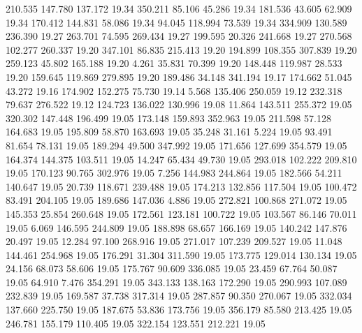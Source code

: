  210.535  147.780  137.172        19.34
 350.211   85.106   45.286        19.34
 181.536   43.605   62.909        19.34
 170.412  144.831   58.086        19.34
  94.045  118.994   73.539        19.34
 334.909  130.589  236.390        19.27
 263.701   74.595  269.434        19.27
 199.595   20.326  241.668        19.27
 270.568  102.277  260.337        19.20
 347.101   86.835  215.413        19.20
 194.899  108.355  307.839        19.20
 259.123   45.802  165.188        19.20
   4.261   35.831   70.399        19.20
 148.448  119.987   28.533        19.20
 159.645  119.869  279.895        19.20
 189.486   34.148  341.194        19.17
 174.662   51.045   43.272        19.16
 174.902  152.275   75.730        19.14
   5.568  135.406  250.059        19.12
 232.318   79.637  276.522        19.12
 124.723  136.022  130.996        19.08
  11.864  143.511  255.372        19.05
 320.302  147.448  196.499        19.05
 173.148  159.893  352.963        19.05
 211.598   57.128  164.683        19.05
 195.809   58.870  163.693        19.05
  35.248   31.161    5.224        19.05
  93.491   81.654   78.131        19.05
 189.294   49.500  347.992        19.05
 171.656  127.699  354.579        19.05
 164.374  144.375  103.511        19.05
  14.247   65.434   49.730        19.05
 293.018  102.222  209.810        19.05
 170.123   90.765  302.976        19.05
   7.256  144.983  244.864        19.05
 182.566   54.211  140.647        19.05
  20.739  118.671  239.488        19.05
 174.213  132.856  117.504        19.05
 100.472   83.491  204.105        19.05
 189.686  147.036    4.886        19.05
 272.821  100.868  271.072        19.05
 145.353   25.854  260.648        19.05
 172.561  123.181  100.722        19.05
 103.567   86.146   70.011        19.05
   6.069  146.595  244.809        19.05
 188.898   68.657  166.169        19.05
 140.242  147.876   20.497        19.05
  12.284   97.100  268.916        19.05
 271.017  107.239  209.527        19.05
  11.048  144.461  254.968        19.05
 176.291   31.304  311.590        19.05
 173.775  129.014  130.134        19.05
  24.156   68.073   58.606        19.05
 175.767   90.609  336.085        19.05
  23.459   67.764   50.087        19.05
  64.910    7.476  354.291        19.05
 343.133  138.163  172.290        19.05
 290.993  107.089  232.839        19.05
 169.587   37.738  317.314        19.05
 287.857   90.350  270.067        19.05
 332.034  137.660  225.750        19.05
 187.675   53.836  173.756        19.05
 356.179   85.580  213.425        19.05
 246.781  155.179  110.405        19.05
 322.154  123.551  212.221        19.05
